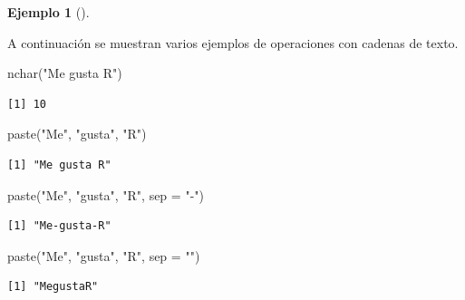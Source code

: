 \documentclass[
  a4paper,
]{scrreport}
\newenvironment{Shaded}{\begin{snugshade}}{\end{snugshade}}
\newcommand{\AttributeTok}[1]{\textcolor[rgb]{0.40,0.45,0.13}{#1}}
\newcommand{\FunctionTok}[1]{\textcolor[rgb]{0.28,0.35,0.67}{#1}}
\newcommand{\NormalTok}[1]{\textcolor[rgb]{0.00,0.23,0.31}{#1}}
\newcommand{\StringTok}[1]{\textcolor[rgb]{0.13,0.47,0.30}{#1}}
\theoremstyle{definition}
\theoremstyle{definition}
\newtheorem{example}{Ejemplo}[chapter]
\theoremstyle{remark}
\begin{document}
\leavevmode{}%
\begin{example}[]\label{exm-operaciones-cadenas}

A continuación se muestran varios ejemplos de operaciones con cadenas de
texto.

\begin{Shaded}
\begin{Highlighting}[]
\FunctionTok{nchar}\NormalTok{(}\StringTok{"Me gusta R"}\NormalTok{)}
\end{Highlighting}
\end{Shaded}

\begin{verbatim}
[1] 10
\end{verbatim}

\begin{Shaded}
\begin{Highlighting}[]
\FunctionTok{paste}\NormalTok{(}\StringTok{"Me"}\NormalTok{, }\StringTok{"gusta"}\NormalTok{, }\StringTok{"R"}\NormalTok{)}
\end{Highlighting}
\end{Shaded}

\begin{verbatim}
[1] "Me gusta R"
\end{verbatim}

\begin{Shaded}
\begin{Highlighting}[]
\FunctionTok{paste}\NormalTok{(}\StringTok{"Me"}\NormalTok{, }\StringTok{"gusta"}\NormalTok{, }\StringTok{"R"}\NormalTok{, }\AttributeTok{sep =} \StringTok{"{-}"}\NormalTok{)}
\end{Highlighting}
\end{Shaded}

\begin{verbatim}
[1] "Me-gusta-R"
\end{verbatim}

\begin{Shaded}
\begin{Highlighting}[]
\FunctionTok{paste}\NormalTok{(}\StringTok{"Me"}\NormalTok{, }\StringTok{"gusta"}\NormalTok{, }\StringTok{"R"}\NormalTok{, }\AttributeTok{sep =} \StringTok{""}\NormalTok{)}
\end{Highlighting}
\end{Shaded}

\begin{verbatim}
[1] "MegustaR"
\end{verbatim}


\end{example}
\end{document}
